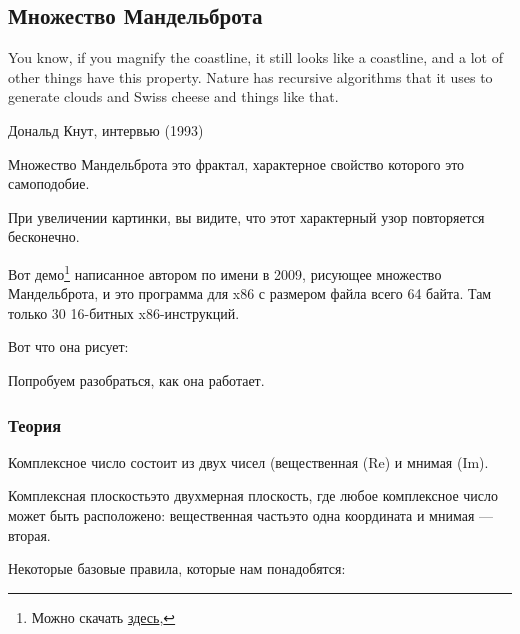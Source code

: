 ﻿\clearpage
\subsection{Множество Мандельброта}
\label{Mandelbrot_demo}

\epigraph{You know, if you magnify the coastline, it still looks like
a coastline, and a lot of other things have this property. Nature has
recursive algorithms that it uses to generate clouds and Swiss cheese
and things like that.}
{Дональд Кнут, интервью (1993)}

Множество Мандельброта это фрактал, характерное свойство которого это самоподобие.

При увеличении картинки, вы видите, что этот характерный узор повторяется бесконечно.

Вот демо\footnote{Можно скачать \href{http://go.yurichev.com/17306} {здесь},} 
написанное автором по имени  в 2009, 
рисующее множество Мандельброта, и это программа для x86 с размером файла всего 64 байта.
Там только 30 16-битных x86-инструкций.

Вот что она рисует:

\begin{figure}[H]
\centering
{}
\end{figure}

Попробуем разобраться, как она работает.

\subsubsection{Теория}


Комплексное число состоит из двух чисел (вещественная (Re) и мнимая (Im).

Комплексная плоскость\EMDASH{}это двухмерная плоскость, где любое комплексное число может быть расположено:
вещественная часть\EMDASH{}это одна координата и мнимая --- вторая.

Некоторые базовые правила, которые нам понадобятся:

